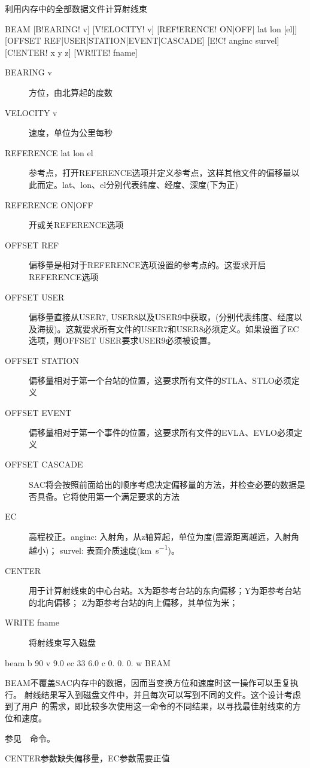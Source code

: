 \label{cmd:beam}

利用内存中的全部数据文件计算射线束

\begin{SACSTX}
BEAM [B!EARING! v] [V!ELOCITY! v] [REF!ERENCE! ON|OFF| lat lon [el]]
    [OFFSET REF|USER|STATION|EVENT|CASCADE] [E!C! anginc survel]
    [C!ENTER! x y z] [WR!ITE! fname]
\end{SACSTX}

\begin{description}
\item [BEARING v] 方位，由北算起的度数
\item [VELOCITY v] 速度，单位为公里每秒
\item [REFERENCE lat lon el] 参考点，打开REFERENCE选项并定义参考点，这样其他文件的偏移量以此而定。lat、lon、el分别代表纬度、经度、深度(下为正)
\item [REFERENCE ON|OFF] 开或关REFERENCE选项
\item [OFFSET REF] 偏移量是相对于REFERENCE选项设置的参考点的。这要求开启REFERENCE选项
\item [OFFSET USER] 偏移量直接从USER7, USER8以及USER9中获取，(分别代表纬度、经度以及海拔)。这就要求所有文件的USER7和USER8必须定义。如果设置了EC选项，则OFFSET USER要求USER9必须被设置。
\item [OFFSET STATION] 偏移量相对于第一个台站的位置，这要求所有文件的STLA、STLO必须定义
\item [OFFSET EVENT] 偏移量相对于第一个事件的位置，这要求所有文件的EVLA、EVLO必须定义
\item [OFFSET CASCADE] SAC将会按照前面给出的顺序考虑决定偏移量的方法，并检查必要的数据是否具备。它将使用第一个满足要求的方法
\item [EC] 高程校正。anginc: 入射角，从z轴算起，单位为度(震源距离越远，入射角越小)；
    survel: 表面介质速度(\si{\km\per\s})。
\item [CENTER] 用于计算射线束的中心台站。X为距参考台站的东向偏移；Y为距参考台站的北向偏移；
	Z为距参考台站的向上偏移，其单位为米；
\item [WRITE fname] 将射线束写入磁盘
\end{description}

\begin{SACDFT}
beam  b 90  v 9.0 ec 33  6.0 c  0. 0. 0. w BEAM
\end{SACDFT}

BEAM不覆盖SAC内存中的数据，因而当变换方位和速度时这一操作可以重复执行。
射线结果写入到磁盘文件中，并且每次可以写到不同的文件。这个设计考虑到了用户
的需求，即比较多次使用这一命令的不同结果，以寻找最佳射线束的方位和速度。

参见~~命令。

CENTER参数缺失偏移量，EC参数需要正值

